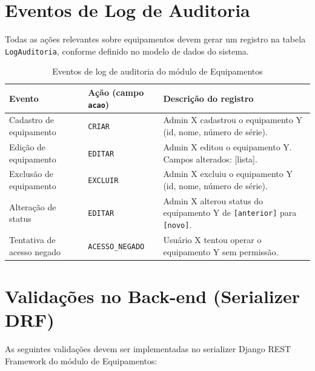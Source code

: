 \documentclass[12pt,a4paper]{article}
\begin{document}
\section{Eventos de Log de Auditoria}

Todas as ações relevantes sobre equipamentos devem gerar um registro na tabela
\texttt{LogAuditoria}, conforme definido no modelo de dados do sistema.

\begin{table}[h]
\centering
\small
\begin{tabular}{L{3.4cm} L{3.1cm} L{6.5cm}}
  \toprule
  \textbf{Evento}                 & \textbf{Ação (campo \texttt{acao})} & \textbf{Descrição do registro} \\
  \midrule

  Cadastro de equipamento
    & \texttt{CRIAR}
    & Admin X cadastrou o equipamento Y (id, nome, número de série). \\
  \addlinespace

  Edição de equipamento
    & \texttt{EDITAR}
    & Admin X editou o equipamento Y. Campos alterados: [lista]. \\
  \addlinespace

  Exclusão de equipamento
    & \texttt{EXCLUIR}
    & Admin X excluiu o equipamento Y (id, nome, número de série). \\
  \addlinespace

  Alteração de status
    & \texttt{EDITAR}
    & Admin X alterou status do equipamento Y de \texttt{[anterior]} para \texttt{[novo]}. \\
  \addlinespace

  Tentativa de acesso negado
    & \texttt{ACESSO\_NEGADO}
    & Usuário X tentou operar o equipamento Y sem permissão. \\

  \bottomrule
\end{tabular}
\caption{Eventos de log de auditoria do módulo de Equipamentos}
\end{table}

\section{Validações no Back-end (Serializer DRF)}

As seguintes validações devem ser implementadas no serializer Django REST Framework
do módulo de Equipamentos:
\end{document}
